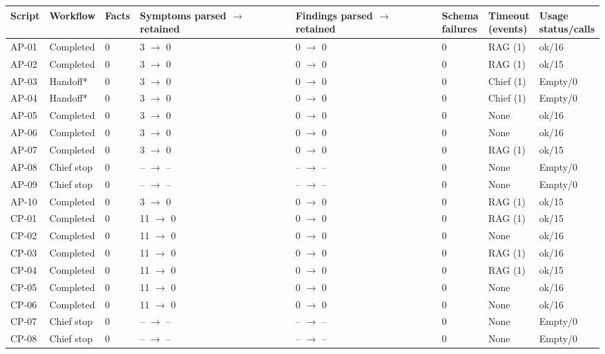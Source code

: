 \begin{tabular}{llllllll}
\hline
Script & Workflow & Facts & \shortstack{Symptoms\\parsed $\to$\\retained} & \shortstack{Findings\\parsed $\to$\\retained} & \shortstack{Schema\\failures} & \shortstack{Timeout\\(events)} & \shortstack{Usage\\status/calls} \\
\hline
AP-01 & Completed & 0 & 3 $\to$ 0 & 0 $\to$ 0 & 0 & RAG (1) & ok/16 \\
AP-02 & Completed & 0 & 3 $\to$ 0 & 0 $\to$ 0 & 0 & RAG (1) & ok/15 \\
AP-03 & Handoff* & 0 & 3 $\to$ 0 & 0 $\to$ 0 & 0 & Chief (1) & Empty/0 \\
AP-04 & Handoff* & 0 & 3 $\to$ 0 & 0 $\to$ 0 & 0 & Chief (1) & Empty/0 \\
AP-05 & Completed & 0 & 3 $\to$ 0 & 0 $\to$ 0 & 0 & None & ok/16 \\
AP-06 & Completed & 0 & 3 $\to$ 0 & 0 $\to$ 0 & 0 & None & ok/16 \\
AP-07 & Completed & 0 & 3 $\to$ 0 & 0 $\to$ 0 & 0 & RAG (1) & ok/15 \\
AP-08 & Chief stop & 0 & -- $\to$ -- & -- $\to$ -- & 0 & None & Empty/0 \\
AP-09 & Chief stop & 0 & -- $\to$ -- & -- $\to$ -- & 0 & None & Empty/0 \\
AP-10 & Completed & 0 & 3 $\to$ 0 & 0 $\to$ 0 & 0 & RAG (1) & ok/15 \\
CP-01 & Completed & 0 & 11 $\to$ 0 & 0 $\to$ 0 & 0 & RAG (1) & ok/15 \\
CP-02 & Completed & 0 & 11 $\to$ 0 & 0 $\to$ 0 & 0 & None & ok/16 \\
CP-03 & Completed & 0 & 11 $\to$ 0 & 0 $\to$ 0 & 0 & RAG (1) & ok/16 \\
CP-04 & Completed & 0 & 11 $\to$ 0 & 0 $\to$ 0 & 0 & RAG (1) & ok/15 \\
CP-05 & Completed & 0 & 11 $\to$ 0 & 0 $\to$ 0 & 0 & None & ok/16 \\
CP-06 & Completed & 0 & 11 $\to$ 0 & 0 $\to$ 0 & 0 & None & ok/16 \\
CP-07 & Chief stop & 0 & -- $\to$ -- & -- $\to$ -- & 0 & None & Empty/0 \\
CP-08 & Chief stop & 0 & -- $\to$ -- & -- $\to$ -- & 0 & None & Empty/0 \\

\end{tabular}
